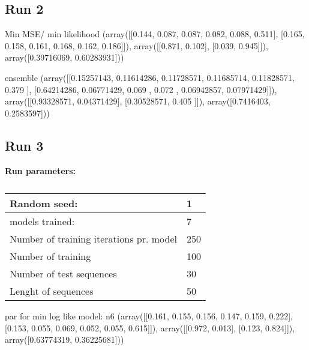 



\subsection{Run 2}


Min MSE/ min likelihood
(array([[0.144, 0.087, 0.087, 0.082, 0.088, 0.511],
        [0.165, 0.158, 0.161, 0.168, 0.162, 0.186]]),
 array([[0.871, 0.102],
        [0.039, 0.945]]),
 array([0.39716069, 0.60283931]))

ensemble
(array([[0.15257143, 0.11614286, 0.11728571, 0.11685714, 0.11828571,
         0.379     ],
        [0.64214286, 0.06771429, 0.069     , 0.072     , 0.06942857,
         0.07971429]]),
 array([[0.93328571, 0.04371429],
        [0.30528571, 0.405     ]]),
 array([0.7416403, 0.2583597]))


\subsection{Run 3}

\textbf{Run parameters:} \\
\begin{table}[]
    \begin{tabular}{@{}ll@{}}
        \toprule
        Random seed:                            & 1   \\ \midrule
        models trained:                         & 7   \\
        Number of training iterations pr. model & 250 \\
        Number of training                      & 100 \\
        Number of test sequences                & 30 \\
        Lenght of sequences                     & 50  \\ \bottomrule
    \end{tabular}
    \caption{}
    \label{tab:my-table}
\end{table}

par for min log like model: n6
(array([[0.161, 0.155, 0.156, 0.147, 0.159, 0.222],
        [0.153, 0.055, 0.069, 0.052, 0.055, 0.615]]),
 array([[0.972, 0.013],
        [0.123, 0.824]]),
 array([0.63774319, 0.36225681]))\\

